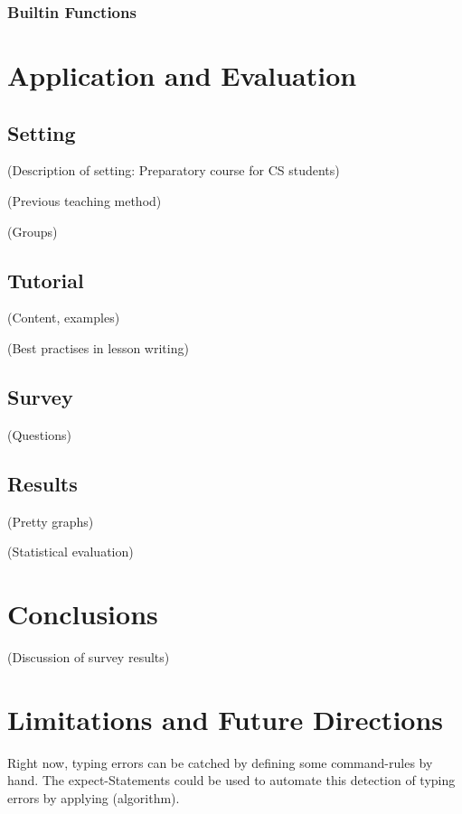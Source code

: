 \documentclass[twoside]{scrreprt}
\begin{document}
\subsection{Builtin Functions}

\chapter{Application and Evaluation}

\section{Setting}

        (Description of setting: Preparatory course for CS students)

        (Previous teaching method)

        (Groups)

\section{Tutorial}

        (Content, examples)

        (Best practises in lesson writing)

\section{Survey}

        (Questions)

\section{Results}

    (Pretty graphs)

    (Statistical evaluation)

\chapter{Conclusions}

(Discussion of survey results)

\chapter{Limitations and Future Directions}

Right now, typing errors can be catched by defining some command-rules by hand. The expect-Statements could be used to automate this detection of typing errors by applying (algorithm).
\end{document}
